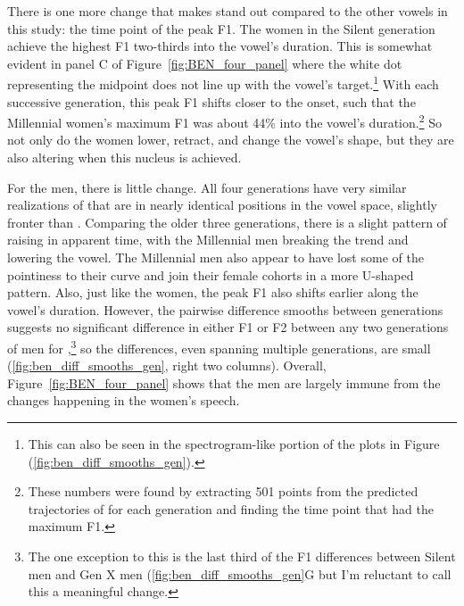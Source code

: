 There is one more change that makes \ben stand out compared to the other vowels in this study: the time point of the peak F1. The women in the Silent generation achieve the highest F1 two-thirds into the vowel's duration. This is somewhat evident in panel C of Figure~\ref{fig:BEN_four_panel} where the white dot representing the midpoint does not line up with the vowel's target.\footnote{This can also be seen in the spectrogram-like portion of the plots in Figure  (\ref{fig:ben_diff_smooths_gen}).} With each successive generation, this peak F1 shifts closer to the onset, such that the Millennial women's maximum F1 was about 44\% into the vowel's duration.\footnote{These numbers were found by extracting 501 points from the predicted trajectories of \ben for each generation and finding the time point that had the maximum F1.} So not only do the women lower, retract, and change the vowel's shape, but they are also altering when this nucleus is achieved.

For the men, there is little change. All four generations have very similar realizations of \ben that are in nearly identical positions in the vowel space, slightly fronter than \bet. Comparing the older three generations, there is a slight pattern of \ben raising in apparent time, with the Millennial men breaking the trend and lowering the vowel. The Millennial men also appear to have lost some of the pointiness to their curve and join their female cohorts in a more U-shaped pattern. Also, just like the women, the peak F1 also shifts earlier along the vowel's duration. However, the pairwise difference smooths between generations suggests no significant difference in either F1 or F2 between any two generations of men for \ben,\footnote{The one exception to this is the last third of the F1 differences between Silent men and Gen X men (\ref{fig:ben_diff_smooths_gen}G but I'm reluctant to call this a meaningful change.} so the differences, even spanning multiple generations, are small (\ref{fig:ben_diff_smooths_gen}, right two columns). Overall, Figure~\ref{fig:BEN_four_panel} shows that the men are largely immune from the changes happening in the women's speech.

